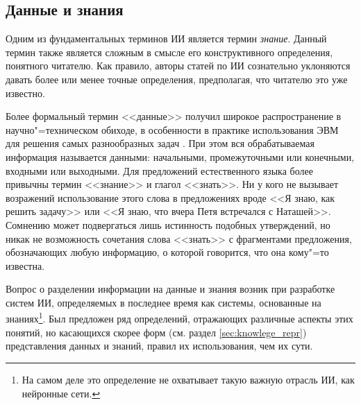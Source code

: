 \documentclass[a4paper,14pt, openany, twoside, draft]{extbook} %
\begin{document}
\subsection{Данные и знания}

Одним из фундаментальных терминов ИИ является термин {\em знание}. Данный термин также является сложным в смысле его конструктивного определения, понятного читателю. Как правило, авторы статей по ИИ сознательно уклоняются давать более или менее точные определения, предполагая, что читателю это уже известно.

Более формальный термин <<данные>> получил широкое распространение в научно"=техническом обиходе, в особенности в практике использования ЭВМ для решения самых разнообразных задач \cite{AIDictionary}. При этом вся обрабатываемая информация называется данными: начальными, промежуточными или конечными, входными или выходными. Для предложений естественного языка более привычны термин <<знание>> и глагол <<знать>>. Ни у кого не вызывает возражений использование этого слова в предложениях вроде <<Я знаю, как решить задачу>> или <<Я знаю, что вчера Петя встречался с Наташей>>. Сомнению может подвергаться лишь истинность подобных утверждений, но никак не возможность сочетания слова <<знать>> с фрагментами предложения, обозначающих любую информацию, о которой говорится, что она кому"=то известна.

Вопрос о разделении информации на данные и знания возник при разработке систем ИИ, определяемых в последнее время как системы, основанные на знаниях\footnote{На самом деле это определение не охватывает такую важную отрасль ИИ, как нейронные сети.}. Был предложен ряд определений, отражающих различные аспекты этих понятий, но касающихся скорее форм (см. раздел \ref{sec:knowlege_repr}) представления данных и знаний, правил их использования, чем их сути.
\end{document}
